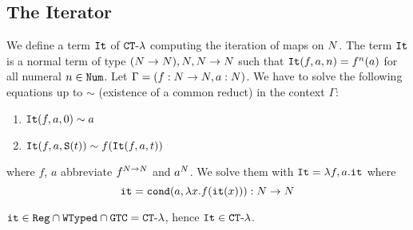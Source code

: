 
\subsection{The Iterator}

\begin{Eg}
We define a term ${\tt It}$ of  ${ {\tt CT}\mbox{-}\lambda}$ computing the iteration of maps on ${N}$.
The term ${\tt It}$ is a normal term of type $({N} \rightarrow {N}), {N},{N} \rightarrow {N}$ such that
${\tt It}(f,a,n)=f^n(a)$ for all numeral $n \in {\tt Num}$. 
Let $\Gamma = (f:{N} \rightarrow {N}, a:{N})$.
We have to solve the following 
equations up to $\sim$ (existence of a common reduct) in the context $\Gamma$:

\begin{enumerate}
\item
${\tt It}(f,a,0) \sim a$ 
\item
${\tt It}(f,a,{\tt S} (t)) \sim f({\tt It}(f,a,t))$
\end{enumerate}

where $f$, $a$ abbreviate $f^{{N}\rightarrow{N}}$ and $a^{N}$.
We solve them with ${\tt It} = \lambda f, a.{\tt it}$
where 
$$
{\tt it} = {\tt cond} (a, \lambda x.f({\tt it}(x))):{N} \rightarrow {N}
$$ 
\end{Eg}

\begin{proposition}
\label{proposition-iterator-in-CT-lambda}
${\tt it} \in {\tt Reg} \cap {\tt WTyped} \cap {\tt GTC} = { {\tt CT}\mbox{-}\lambda}$, 
hence ${\tt It} \in { {\tt CT}\mbox{-}\lambda}$.
\end{proposition}


